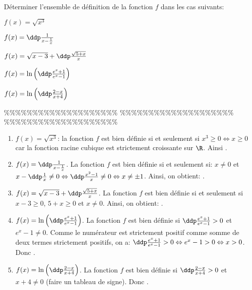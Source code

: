 



\begin{exercice}  \;
D\'eterminer l'ensemble de d\'efinition de la fonction $f$ dans les cas suivants:
\begin{enumerate}
\noindent \begin{minipage}[t]{0.4\textwidth}
 \item $f(x)=\sqrt{x^3}$
\item $f(x)= \ddp\frac{1}{x-\frac{1}{x}}$
\item $f(x)=\sqrt{x-3} +\ddp\frac{\sqrt{5+x}}{x} $
\end{minipage}
\begin{minipage}[t]{0.4\textwidth}
 \item $f(x)=\ln{\left(\ddp\frac{e^x+1}{e^x-1}\right)}$
 \item $f(x)=\ln{\left(\ddp\frac{2-x}{x+4}\right)}$
\end{minipage}
\end{enumerate}
\end{exercice}


\%\%\%\%\%\%\%\%\%\%\%\%\%\%\%\%\%\%\%\%
\%\%\%\%\%\%\%\%\%\%\%\%\%\%\%\%\%\%\%\%
\%\%\%\%\%\%\%\%\%\%\%\%\%\%\%\%\%\%\%\%



\begin{correction}  \;
\begin{enumerate}
 \item $f(x)=\sqrt{x^3}$: la fonction $f$ est bien d\'efinie si et seulement si $x^3\geq 0\Leftrightarrow x\geq 0$ car la fonction racine cubique est strictement croissante sur $\R$. Ainsi .
\item $f(x)= \ddp\frac{1}{x-\frac{1}{x}}$. La fonction $f$ est bien d\'efinie si et seulement si: $x\not= 0$ et $x-\ddp\frac{1}{x}\not= 0\Leftrightarrow \ddp\frac{x^2-1}{x}\not= 0\Leftrightarrow x\not=\pm 1$. Ainsi, on obtient: .
\item $f(x)=\sqrt{x-3} +\ddp\frac{\sqrt{5+x}}{x} $. La fonction $f$ est bien d\'efinie si et seulement si $x-3\geq 0$, $5+x\geq 0$ et $x\not= 0$. Ainsi, on obtient: .
\item $f(x)=\ln{\left(\ddp\frac{e^x+1}{e^x-1}\right)}$. La fonction $f$ est bien d\'efinie si $\ddp\frac{e^x+1}{e^x-1}>0$ et $e^x-1\not= 0$. Comme le num\'erateur est strictement positif comme somme de deux termes strictement positifs, on a: $\ddp\frac{e^x+1}{e^x-1}>0\Leftrightarrow e^x-1>0\Leftrightarrow x>0$. Donc .
\item $f(x) = \ln{\left(\ddp\frac{2-x}{x+4}\right)}$. La fonction $f$ est bien d\'efinie si $\ddp\frac{2-x}{x+4}>0$ et $x+4\not= 0$ (faire un tableau de signe). Donc .
\end{enumerate}
\end{correction}